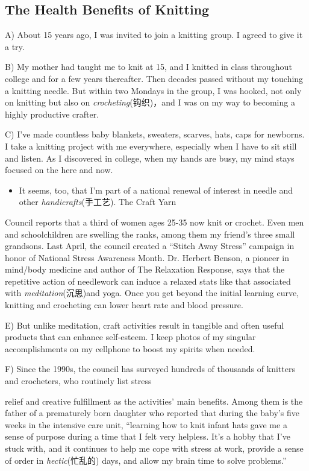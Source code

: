 \documentclass[UTF8,11pt]{ctexart}
\begin{document}
\subsection*{\textbf{The Health Benefits of Knitting}}


A) About 15 years ago, I was invited to join a knitting group. I agreed to give it a try.


B) My mother had taught me to knit at 15, and I knitted in class throughout college and for a few years thereafter. Then decades passed without my touching a knitting needle. But within two Mondays in the group, I was hooked, not only on knitting but also on\textit{ crocheting}(钩织)，and I was on my way to becoming a highly productive crafter.


C) I’ve made countless baby blankets, sweaters, scarves, hats, caps for newborns. I take a knitting project with me everywhere, especially when I have to sit still and listen. As I discovered in college, when my hands are busy, my mind stays focused on the here and now.


\begin{itemize}[leftmargin=2em,itemsep=.2em,topsep=.4em]\item[D.] It seems, too, that I’m part of a national renewal of interest in needle and other\textit{ handicrafts}(手工艺). The Craft Yarn
\end{itemize}

Council reports that a third of women ages 25-35 now knit or crochet. Even men and schoolchildren are swelling the ranks, among them my friend’s three small grandsons. Last April, the council created a “Stitch Away Stress” campaign in honor of National Stress Awareness Month. Dr. Herbert Benson, a pioneer in mind/body medicine and author of The Relaxation Response, says that the repetitive action of needlework can induce a relaxed stats like that associated with\textit{ meditation}(沉思)and yoga. Once you get beyond the initial learning curve, knitting and crocheting can lower heart rate and blood pressure.


E) But unlike meditation, craft activities result in tangible and often useful products that can enhance self-esteem. I keep photos of my singular accomplishments on my cellphone to boost my spirits when needed.


F) Since the 1990s, the council has surveyed hundreds of thousands of knitters and crocheters, who routinely list stress


relief and creative fulfillment as the activities’ main benefits. Among them is the father of a prematurely born daughter who reported that during the baby’s five weeks in the intensive care unit, “learning how to knit infant hats gave me a sense of purpose during a time that I felt very helpless. It’s a hobby that I’ve stuck with, and it continues to help me cope with stress at work, provide a sense of order in\textit{ hectic}(忙乱的) days, and allow my brain time to solve problems.”
\end{document}
